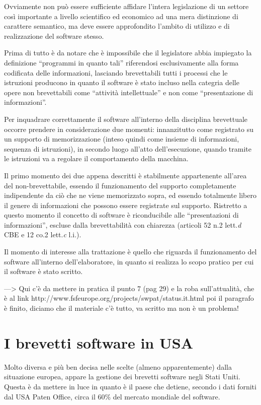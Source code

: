 Ovviamente non può essere sufficiente affidare l'intera legislazione di un settore così importante a livello scientifico ed economico ad una mera distinzione di carattere semantico, ma deve essere approfondito l'ambito di utilizzo e di realizzazione del software stesso.

Prima di tutto è da notare che è impossibile che il legislatore abbia impiegato la definizione ``programmi in quanto tali'' riferendosi esclusivamente alla forma codificata delle informazioni, lasciando brevettabili tutti i processi che le istruzioni producono in quanto il software è stato incluso nella categria delle opere non brevettabili come ``attività intellettuale'' e non come ``presentazione di informazioni''.

Per inquadrare correttamente il software all'interno della disciplina brevettuale occorre prendere in considerazione due momenti: innanzitutto come registrato su un supporto di memorizzazione (inteso quindi come insieme di informazioni, sequenza di istruzioni), in secondo luogo all'atto dell'esecuzione, quando tramite le istruzioni va a regolare il comportamento della macchina.

Il primo momento dei due appena descritti è stabilmente appartenente all'area del non-brevettabile, essendo il funzionamento del supporto completamente indipendente da ciò che ne viene memorizzato sopra, ed essendo totalmente libero il genere di informazioni che possono essere registrate sul supporto. Ristretto a questo momento il concetto di software è riconducibile alle ``presentazioni di informazioni'', escluse dalla brevettabilità con chiarezza (articoli 52 n.2 lett.\textit{d} CBE e 12 co.2 lett.\textit{c} l.i.).

Il momento di interesse alla trattazione è quello che riguarda il funzionamento del software all'interno dell'elaboratore, in quanto si realizza lo scopo pratico per cui il software è stato scritto.

---> Qui c'è da mettere in pratica il punto 7 (pag 29) e la roba sull'attualità, che è al link http://www.fsfeurope.org/projects/swpat/status.it.html poi il paragrafo è finito, diciamo che il materiale c'è tutto, va scritto ma non è un problema!
\section{I brevetti software in USA}

Molto diversa e più ben decisa nelle scelte (almeno apparentemente) dalla situazione europea, appare la gestione dei brevetti software negli Stati Uniti. Questa è da mettere in luce in quanto è il paese che detiene, secondo i dati forniti dal USA Paten Office, circa il 60\% del mercato mondiale del software.

